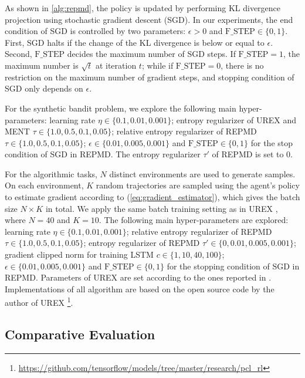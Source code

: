 \documentclass{article} %
\begin{document}
As shown in \cref{alg:repmd}, the policy is updated by performing KL divergence projection using stochastic gradient descent (SGD). In our experiments, the end condition of SGD is controlled by two parameters: $\epsilon > 0$ and $\text{F\_STEP}\in \{0,1 \}$. First, SGD halts if the change of the KL divergence is below or equal to $\epsilon$. Second, $\text{F\_STEP}$ decides the maximum number of SGD steps. If $\text{F\_STEP}=1$, the maximum number is $\sqrt{t}$ at iteration $t$; while if $\text{F\_STEP}=0$, there is no restriction on the maximum number of gradient steps, and stopping condition of SGD only depends on $\epsilon$.

For the synthetic bandit problem, we explore the following main hyper-parameters: learning rate $\eta \in \{0.1, 0.01, 0.001\}$; entropy regularizer of UREX and MENT $\tau\in \{1.0, 0.5, 0.1, 0.05\}$; relative entropy regularizer of REPMD $\tau\in \{1.0, 0.5, 0.1, 0.05\}$; $\epsilon\in \{0.01, 0.005, 0.001\}$ and $\text{F\_STEP}\in \{0,1\}$ for the stop condition of SGD in REPMD. The entropy regularizer $\tau'$ of REPMD is set to 0.  

For the algorithmic tasks, $N$ distinct environments are used to generate samples. On each environment, $K$ random trajectories are sampled using the agent's policy to estimate gradient according to (\ref{eq:gradient_estimator}), which gives the batch size $N\times K$ in total. We apply the same batch training setting as in UREX \citep{nachum2017improving}, where $N=40$ and $K=10$. The following main hyper-parameters are explored: learning rate $\eta \in \{0.1, 0.01, 0.001\}$; relative entropy regularizer of REPMD $\tau\in \{1.0, 0.5, 0.1, 0.05\}$; entropy regularizer of REPMD $\tau'\in \{0, 0.01, 0.005, 0.001\}$; gradient clipped norm for training LSTM $c\in \{1, 10, 40, 100\}$; $\epsilon\in \{0.01, 0.005, 0.001\}$ and $\text{F\_STEP}\in \{0,1\}$ for the stopping condition of SGD in REPMD. Parameters of UREX are set according to the ones reported in \citet{nachum2017improving}. Implementations of all algorithm are based on the open source code by the author of UREX \footnote{\url{https://github.com/tensorflow/models/tree/master/research/pcl_rl}}.

\subsection{Comparative Evaluation}
\end{document}
